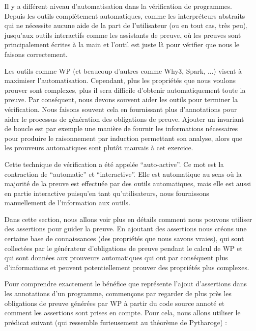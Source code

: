 Il y a différent niveau d'automatisation dans la vérification de programmes.
Depuis les outils complètement automatiques, comme les interpréteurs abstraits
qui ne nécessite aucune aide de la part de l'utilisateur (ou en tout cas, très peu),
jusqu'aux outils interactifs comme les assistants de preuve, où les preuves sont
principalement écrites à la main et l'outil est juste là pour vérifier que nous
le faisons correctement.


Les outils comme WP (et beaucoup d'autres comme Why3, Spark, ...) visent à
maximiser l'automatisation. Cependant, plus les propriétés que nous voulons
prouver sont complexes, plus il sera difficile d'obtenir automatiquement toute
la preuve. Par conséquent, nous devons souvent aider les outils pour terminer
la vérification. Nous faisons souvent cela en fournissant plus d'annotations
pour aider le processus de génération des obligations de preuve. Ajouter un
invariant de boucle est par exemple une manière de fournir les informations
nécessaires pour produire le raisonnement par induction permettant son analyse,
alors que les prouveurs automatiques sont plutôt mauvais à cet exercice.


Cette technique de vérification a été appelée ``auto-active''. Ce mot est la
contraction de ``automatic'' et ``interactive''. Elle est automatique au sens
où la majorité de la preuve est effectuée par des outils automatiques, mais
elle est aussi en partie interactive puisqu'en tant qu'utilisateurs, nous
fournissons manuellement de l'information aux outils.


Dans cette section, nous allons voir plus en détails comment nous pouvons
utiliser des assertions pour guider la preuve. En ajoutant des assertions nous
créons une certaine base de connaissances (des propriétés que nous savons vraies),
qui sont collectées par le générateur d'obligations de preuve pendant le calcul
de WP et qui sont données aux prouveurs automatiques qui ont par conséquent plus
d'informations et peuvent potentiellement prouver des propriétés plus complexes.




Pour comprendre exactement le bénéfice que représente l'ajout d'assertions dans
les annotations d'un programme, commençons par regarder de plus près les
obligations de preuve générées par WP à partir du code source annoté et comment
les assertions sont prises en compte. Pour cela, nous allons utiliser le prédicat
suivant (qui ressemble furieusement au théorème de Pytharoge) :



